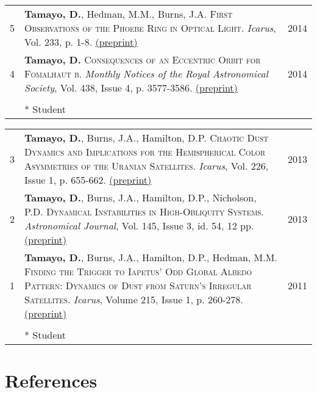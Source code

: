 \documentclass[10pt]{article} %
\begin{document}
\begin{tabular}{>{\hfill}r|p{14.3cm}l}
5 & {\bf Tamayo, D.}, Hedman, M.M., Burns, J.A. \textsc{First Observations of the Phoebe Ring in Optical Light}. {\it Icarus}, Vol. 233, p. 1-8. \href{http://arxiv.org/abs/1401.6166}{(preprint)}& 2014  \\

4 & {\bf Tamayo, D.} \textsc{Consequences of an Eccentric Orbit for Fomalhaut b}. {\it Monthly Notices of the Royal Astronomical Society}, Vol. 438, Issue 4, p. 3577-3586. \href{http://arxiv.org/abs/1312.7020}{(preprint)} & 2014 \\

\multicolumn{3}{c}{} \\

& * Student
\end{tabular}

\begin{tabular}{>{\hfill}r|p{14.3cm}l}

3 & {\bf Tamayo, D.}, Burns, J.A., Hamilton, D.P. \textsc{Chaotic Dust Dynamics and Implications for the Hemispherical Color Asymmetries of the Uranian Satellites}. {\it Icarus}, Vol. 226, Issue 1, p. 655-662. \href{http://arxiv.org/abs/1306.3973}{(preprint)} & 2013 \\ 

2 & {\bf Tamayo, D.}, Burns, J.A., Hamilton, D.P., Nicholson, P.D. \textsc{Dynamical Instabilities in High-Obliquity Systems}. {\it Astronomical Journal}, Vol. 145, Issue 3, id. 54, 12 pp. \href{http://arxiv.org/abs/1212.0028}{(preprint)} & 2013 \\

1 & {\bf Tamayo, D.}, Burns, J.A., Hamilton, D.P., Hedman, M.M. \textsc{Finding the Trigger to Iapetus' Odd Global Albedo Pattern: Dynamics of Dust from Saturn's Irregular Satellites}. {\it Icarus}, Volume 215, Issue 1, p. 260-278. \href{http://arxiv.org/abs/1106.1893}{(preprint)} & 2011 \\

\multicolumn{3}{c}{} \\

& * Student
\end{tabular}


\section{References}
\end{document}
